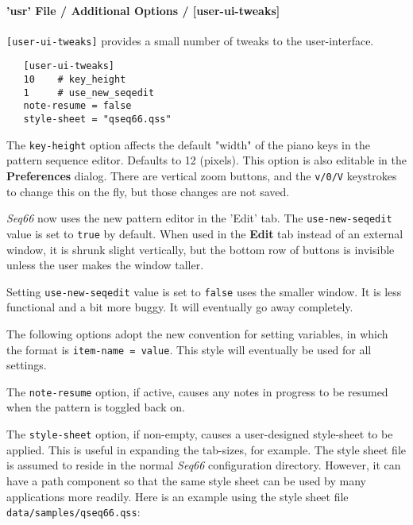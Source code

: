 \paragraph{'usr' File / Additional Options / [user-ui-tweaks]}
\label{paragraph:user_file_added_options_tweaks}

   \texttt{[user-ui-tweaks]} provides a small number of tweaks to the
   user-interface.

   \begin{verbatim}
   [user-ui-tweaks]
   10    # key_height
   1     # use_new_seqedit
   note-resume = false
   style-sheet = "qseq66.qss"
   \end{verbatim}

   The \texttt{key-height} option
   affects the default "width" of the piano keys in the pattern
   sequence editor.  Defaults to 12 (pixels).
   This option is also editable in the \textbf{Preferences} dialog.
   There are vertical zoom buttons, and the \texttt{v/0/V} keystrokes to change
   this on the fly, but those changes are not saved.

   \textsl{Seq66} now uses the new pattern editor in the 'Edit' tab.
   The \texttt{use-new-seqedit} value is set to \texttt{true} by default.
   When used in the \textbf{Edit} tab instead of an external window,
   it is shrunk slight vertically, but the bottom row of buttons is invisible
   unless the user makes the window taller.

   Setting \texttt{use-new-seqedit} value is set to \texttt{false} uses the 
   smaller window.
   It is less functional and a bit more buggy.
   It will eventually go away completely.

   The following options adopt the new convention for setting variables, in
   which the format is \texttt{item-name = value}.
   This style will eventually be used for all settings.

   The \texttt{note-resume} option, if active, causes any notes in progress
   to be resumed when the pattern is toggled back on.

   The \texttt{style-sheet} option, if non-empty, causes a user-designed
   style-sheet to be applied.  This is useful in expanding the tab-sizes, for
   example.
   The style sheet file is assumed to reside in the normal \textsl{Seq66}
   configuration directory.
   However, it can have a path component so that the same style sheet
   can be used by many applications more readily.
   Here is an example using the style sheet file
   \texttt{data/samples/qseq66.qss}:

